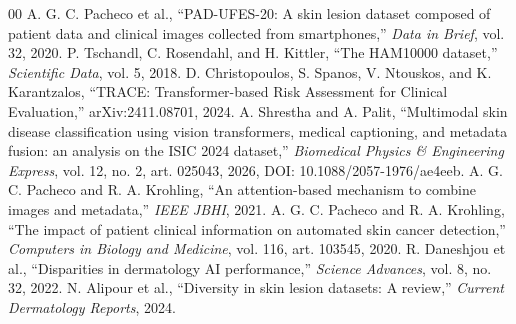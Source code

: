\documentclass[conference]{IEEEtran}
\begin{document}
\vspace{-4pt}
\footnotesize
\begin{thebibliography}{00}
 A. G. C. Pacheco et al., ``PAD-UFES-20: A skin lesion dataset composed of patient data and clinical images collected from smartphones,'' \emph{Data in Brief}, vol. 32, 2020.
 P. Tschandl, C. Rosendahl, and H. Kittler, ``The HAM10000 dataset,'' \emph{Scientific Data}, vol. 5, 2018.
 D. Christopoulos, S. Spanos, V. Ntouskos, and K. Karantzalos, ``TRACE: Transformer-based Risk Assessment for Clinical Evaluation,'' arXiv:2411.08701, 2024.
 A. Shrestha and A. Palit, ``Multimodal skin disease classification using vision transformers, medical captioning, and metadata fusion: an analysis on the ISIC 2024 dataset,'' \emph{Biomedical Physics \& Engineering Express}, vol. 12, no. 2, art. 025043, 2026, DOI: 10.1088/2057-1976/ae4eeb.
 A. G. C. Pacheco and R. A. Krohling, ``An attention-based mechanism to combine images and metadata,'' \emph{IEEE JBHI}, 2021.
 A. G. C. Pacheco and R. A. Krohling, ``The impact of patient clinical information on automated skin cancer detection,'' \emph{Computers in Biology and Medicine}, vol. 116, art. 103545, 2020.
 R. Daneshjou et al., ``Disparities in dermatology AI performance,'' \emph{Science Advances}, vol. 8, no. 32, 2022.
 N. Alipour et al., ``Diversity in skin lesion datasets: A review,'' \emph{Current Dermatology Reports}, 2024.
\end{thebibliography}
\end{document}
